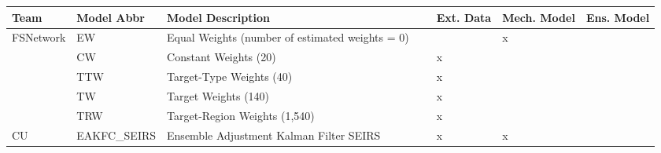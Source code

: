 \begin{table*}
\setlength{\tabcolsep}{4pt} 
\begin{tabular}{p{1.6cm} l p{7.5cm} l  p{1cm}  p{1cm} p{1cm}}
\hline
Team     & Model Abbr& Model Description & & Ext. Data & Mech. Model & Ens. Model \\ 
\hline

FSNetwork & EW       & Equal Weights (number of estimated weights = 0) & ~ & ~  & x\\
 & CW       & Constant Weights (20) &  & x & \\
 & TTW      & Target-Type Weights (40) & & x & \\ 
 & TW       & Target Weights (140) & &  x & \\ 
 & TRW      & Target-Region Weights (1,540) & & x & \\ 
\hline
CU       & EAKFC\_SEIRS       & Ensemble Adjustment Kalman Filter SEIRS & \cite{Pei2017}  & x & x & \\ 


\end{tabular}
\end{table*}
